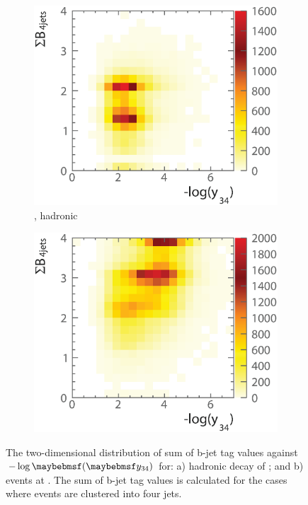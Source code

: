 \begin{figure}[!htbp]
  \begin{subfigure}[b]{0.45\textwidth}
    \includegraphics[width=\textwidth]{doubleHiggs/preSel/mutual6022bbWW2}
    \caption{\eeToHHbbWW, hadronic}
    \label{fig:doubleHiggs1.4MutualbbWW}
  \end{subfigure}
    \begin{subfigure}[b]{0.45\textwidth}
    \includegraphics[width=\textwidth]{doubleHiggs/preSel/mutual6022bbbb2}
    \caption{\eeToHHbbbb}
    \label{fig:doubleHiggs1.4Mutualbbbb}
  \end{subfigure}
\caption[Sum of b-jet tag values as a function of $-\log\parenths{\y{34}}$ at ]%
   {The two-dimensional distribution of sum of b-jet tag values against $-\log\parenths{\y{34}}$ for:  a) hadronic \WW decay of \eeToHHbbWW; and b) \eeToHHbbbb events at . The sum of b-jet tag values is calculated for the cases where events are clustered into four jets.}
   \label{fig:doubleHiggsMutualPreselection}
\end{figure}



